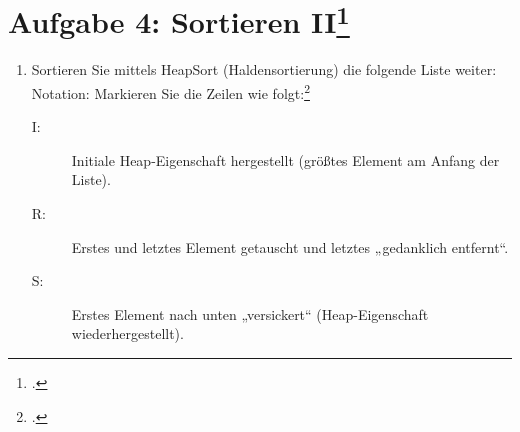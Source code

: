 \documentclass{lehramt-informatik-minimal}
\begin{document}
\section{Aufgabe 4: Sortieren II\footcite[entnommen aus Algorithmen und
Datenstrukturen, Übungsblatt 4, Universität Würzburg]{aud:pu:7}}

\begin{enumerate}


\item Sortieren Sie mittels HeapSort (Haldensortierung) die folgende
Liste weiter: Notation: Markieren Sie die Zeilen wie
folgt:\footcite[Staatsexamen Theoretische Informatik, Algorithmen und
Datenstrukturen, Realschulen, Frühjahr 2013, Thema 2 Aufgabe 6
(Auszug)]{examen:46115:2013:03}

\begin{description}
\item[I:] Initiale Heap-Eigenschaft hergestellt (größtes Element am
Anfang der Liste).

\item[R:] Erstes und letztes Element getauscht und letztes „gedanklich
entfernt“.

\item[S:] Erstes Element nach unten „versickert“ (Heap-Eigenschaft
wiederhergestellt).
\end{description}

\end{enumerate}
\end{document}
